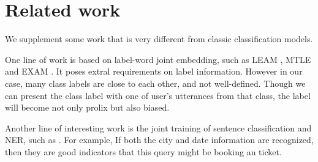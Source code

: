\section{Related work}
We supplement some work that is very different from classic classification models.

One  line  of  work  is  based  on  label-word  joint  embedding,  such  as LEAM
\cite{wang2018joint}, MTLE \cite{zhang2017multi} and EXAM \cite{du2019explicit}.
It  poses  extral  requirements  on label information. However in our case, many
class  labels  are  close  to  each  other,  and not well-defined. Though we can
present the class label with one of user's utterances from that class, the label
will  become  not  only prolix but also biased.

Another   line   of   interesting   work  is  the  joint  training  of  sentence
classification     and     NER,     such    as    
\cite{kruengkrai2020improving,zhang2020graph,hakkani2016multi,liu2016attention,goo2018slot}.  
For  example,  If  both  the  city and date information are
recognized,  then  they  are good indicators that this query might be booking an
ticket. 


